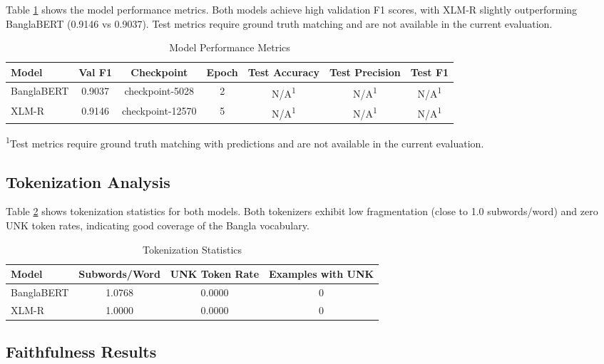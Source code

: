 \documentclass[journal]{IEEEtran}
\begin{document}
Table \ref{tab:model_performance} shows the model performance metrics. Both models achieve high validation F1 scores, with XLM-R slightly outperforming BanglaBERT (0.9146 vs 0.9037). Test metrics require ground truth matching and are not available in the current evaluation.

\begin{table}[htbp]
\centering
\caption{Model Performance Metrics}
\label{tab:model_performance}
\begin{tabular}{lcccccc}
\toprule
Model & Val F1 & Checkpoint & Epoch & Test Accuracy & Test Precision & Test F1 \\
\midrule
BanglaBERT & 0.9037 & checkpoint-5028 & 2 & N/A\textsuperscript{1} & N/A\textsuperscript{1} & N/A\textsuperscript{1} \\
XLM-R & 0.9146 & checkpoint-12570 & 5 & N/A\textsuperscript{1} & N/A\textsuperscript{1} & N/A\textsuperscript{1} \\
\bottomrule
\end{tabular}
\footnotesize
\textsuperscript{1}Test metrics require ground truth matching with predictions and are not available in the current evaluation.
\end{table}

\subsection{Tokenization Analysis}

Table \ref{tab:tokenization} shows tokenization statistics for both models. Both tokenizers exhibit low fragmentation (close to 1.0 subwords/word) and zero UNK token rates, indicating good coverage of the Bangla vocabulary.

\begin{table}[htbp]
\centering
\caption{Tokenization Statistics}
\label{tab:tokenization}
\begin{tabular}{lccc}
\toprule
Model & Subwords/Word & UNK Token Rate & Examples with UNK \\
\midrule
BanglaBERT & 1.0768 & 0.0000 & 0 \\
XLM-R & 1.0000 & 0.0000 & 0 \\
\bottomrule
\end{tabular}
\end{table}

\subsection{Faithfulness Results}
\end{document}
